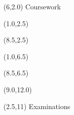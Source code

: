 \documentclass [] {report}
\begin{document}






\begin{textblock}{10}(6,2.0) %
{\huge Coursework}
\end{textblock}


\begin{textblock}{6.5}(1.0,2.5)
\end{textblock}

\begin{textblock}{6.5}(8.5,2.5)
\end{textblock}

\begin{textblock}{6.5}(1.0,6.5)
\end{textblock}

\begin{textblock}{6.5}(8.5,6.5)
\end{textblock}

\begin{textblock}{7.5}(9.0,12.0)
\end{textblock}



\begin{textblock}{10}(2.5,11) %
{\huge Examinations}
\end{textblock}


\end{document}
